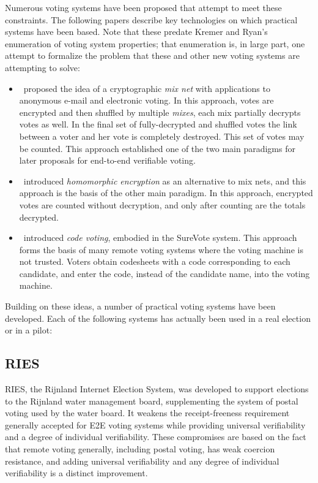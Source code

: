 Numerous voting systems have been proposed that attempt to meet these
constraints.  The following papers describe key technologies on which
practical systems have been based.  Note that these predate Kremer and
Ryan's enumeration of voting system properties; that enumeration is, in
large part, one attempt to formalize the problem that these and other new
voting systems are attempting to solve:

\begin{itemize}
  \item \cite{chaum1981}~proposed the idea of a cryptographic \emph{mix net}
    with applications to anonymous e-mail and electronic voting. In this
    approach, votes are encrypted and then shuffled by multiple
    \emph{mixes}, each mix partially decrypts votes as well. In the final
    set of fully-decrypted and shuffled votes the link between a voter and
    her vote is completely destroyed. This set of votes may be counted. This
    approach established one of the two main paradigms for later proposals
    for end-to-end verifiable voting.
  \item \cite{benaloh1985}~introduced \emph{homomorphic encryption} as an
    alternative to mix nets, and this approach is the basis of the other
    main paradigm.  In this approach, encrypted votes are counted without
    decryption, and only after counting are the totals decrypted.
  \item \cite{chaum2001}~introduced \emph{code voting}, embodied in the
    SureVote system. This approach forms the basis of many remote voting
    systems where the voting machine is not trusted. Voters obtain
    codesheets with a code corresponding to each candidate, and enter the
    code, instead of the candidate name, into the voting machine.
\end{itemize}

Building on these ideas, a number of practical voting systems have been
developed.  Each of the following systems has actually been used in a real
election or in a pilot:

\subsection{RIES~\cite{hubbers2004}}

RIES, the Rijnland Internet Election System, was developed to support
elections to the Rijnland water management board, supplementing the system
of postal voting used by the water board.  It weakens the receipt-freeness
requirement generally accepted for E2E voting systems while providing
universal verifiability and a degree of individual verifiability.  These
compromises are based on the fact that remote voting generally, including
postal voting, has weak coercion resistance, and adding universal
verifiability and any degree of individual verifiability is a distinct
improvement.

